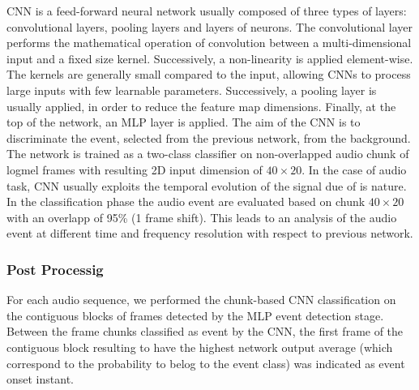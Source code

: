 \documentclass{article}
\begin{document}
\begin{sloppy}
CNN is a feed-forward neural network \cite{Yann-cnn-1998} usually composed of three types of layers: convolutional layers, pooling layers and layers of neurons. The convolutional layer performs the mathematical operation of convolution between a multi-dimensional input and a fixed size kernel. Successively, a non-linearity is applied element-wise. The kernels are generally small compared to the input, allowing CNNs to process large inputs with few learnable parameters. Successively, a pooling layer is usually applied, in order to reduce the feature map dimensions. Finally, at the top of the network, an MLP layer is applied.
The aim of the CNN is to discriminate the event, selected from the previous network, from the background. The network is trained as a two-class classifier on non-overlapped audio chunk of logmel frames with resulting 2D input dimension of $40\times20$. In the case of audio task, CNN usually exploits the temporal evolution of the signal \cite{thomas2014analyzing} due of is nature. 
In the classification phase the audio event are evaluated based on chunk $40\times20$ with an overlapp of 95\% (1 frame shift). This leads to an analysis of the audio event at different time and frequency resolution with respect to previous network. 
\subsubsection{Post Processig }
For each audio sequence, we performed the chunk-based CNN classification on the contiguous blocks of frames detected by the MLP event detection stage. Between the frame chunks classified as event by the CNN, %
the first frame of the contiguous block resulting to have the highest network output average (which correspond to the probability to belog to the event class) was indicated as event onset instant.


\end{sloppy}
\end{document}
